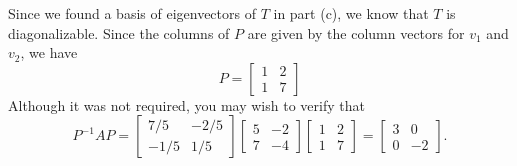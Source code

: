 \documentclass[12pt]{article}
\begin{document}
\begin{enumerate}
\begin{enumerate}
Since we found a basis of eigenvectors of $T$ in part (c), we know that $T$ is diagonalizable. Since the columns of $P$ are given by the column vectors for $v_1$ and $v_2$, we have
\[
 P = \begin{bmatrix}1&2\\1&7\end{bmatrix}
\]
Although it was not required, you may wish to verify that
\[
 P^{-1}AP = \begin{bmatrix}7/5&-2/5\\-1/5&1/5\end{bmatrix}\begin{bmatrix}5&-2\\7&-4\end{bmatrix}\begin{bmatrix}1&2\\1&7\end{bmatrix} = \begin{bmatrix}3&0\\0&-2\end{bmatrix}.
\]

\end{enumerate}
\end{enumerate}
\end{document}
